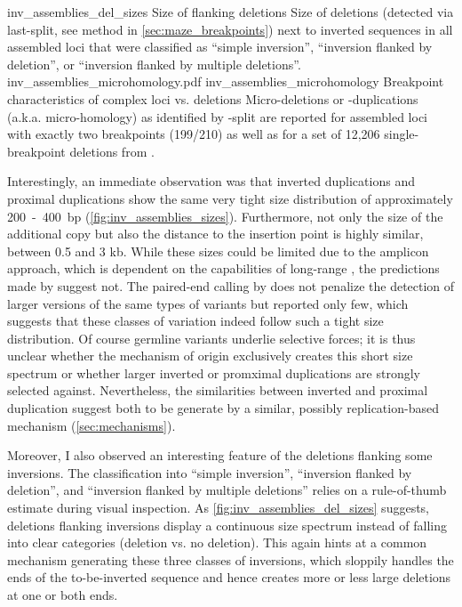     {inv_assemblies_del_sizes}
    {Size of flanking deletions}
    {Size of deletions (detected via \acs{last}-split, see method in
    \cref{sec:maze_breakpoints}) next to inverted sequences in all assembled
    loci that were classified as ``simple inversion'', ``inversion flanked by
    deletion'', or ``inversion flanked by multiple deletions''.}
        {inv_assemblies_microhomology.pdf}
    {inv_assemblies_microhomology}
    {Breakpoint characteristics of complex loci vs. deletions}
    {Micro-deletions or -duplications (a.k.a. micro-homology) as identified by
    \last-split are reported for assembled loci with exactly two breakpoints
    (199/210) as well as for a set of 12,206 single-breakpoint deletions from
    \citet{Sudmant2015}.}

Interestingly, an immediate observation was that inverted duplications and
proximal duplications show the same very tight size distribution of
approximately 200~-~400~bp (\cref{fig:inv_assemblies_sizes}). Furthermore, not
only the size of the
additional copy but also the distance to the insertion point is highly similar,
between 0.5 and 3 kb. While these sizes could be limited due to the amplicon
approach, which is dependent on the capabilities of long-range \pcr, the
predictions made by \delly suggest not. The paired-end calling by \delly does
not penalize the detection of larger versions of the same types of variants but
reported only few, which suggests that these classes of variation indeed follow
such a tight size distribution. Of course germline variants underlie selective
forces; it is thus unclear whether the mechanism of origin exclusively creates
this short size spectrum or whether larger inverted or promximal duplications
are strongly selected against. Nevertheless, the similarities between inverted
and proximal duplication suggest both to be generate by a similar, possibly
replication-based mechanism (\cref{sec:mechanisms}).

Moreover, I also observed an interesting feature of the deletions flanking some
inversions. The classification into ``simple inversion'', ``inversion flanked by
deletion'', and ``inversion flanked by multiple deletions'' relies on a
rule-of-thumb estimate during visual inspection. As
\cref{fig:inv_assemblies_del_sizes} suggests, deletions flanking inversions
display a continuous size spectrum instead of falling into clear categories
(deletion vs. no deletion). This again hints at a common mechanism generating
these three classes of inversions, which sloppily handles the ends of the
to-be-inverted sequence and hence creates more or less large deletions at one
or both ends.



